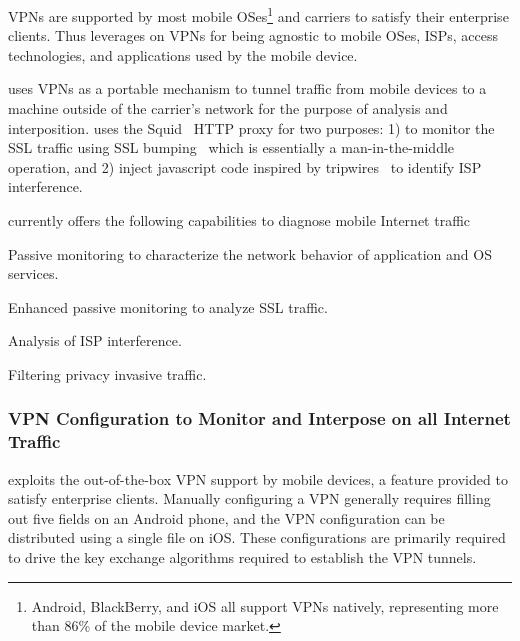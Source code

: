 VPNs are supported by most mobile OSes\footnote{Android, BlackBerry, and iOS all support VPNs natively, representing more than 86\% of the mobile device market\cite{gartner-phone-share}.} and carriers to satisfy their enterprise clients. 
Thus \meddle leverages on VPNs for being agnostic to mobile OSes, ISPs, access technologies, and applications used by the mobile device.


\meddle uses VPNs as a portable mechanism to tunnel traffic from mobile devices to a machine outside of the carrier's network for the purpose of analysis and interposition.
\meddle uses the Squid~\cite{squid} HTTP proxy for two purposes: 1) to monitor the SSL traffic using SSL bumping~\cite{sslbump} which is essentially a man-in-the-middle operation, and 2) inject javascript code inspired by tripwires~\cite{tripwires} to identify ISP interference.

\meddle currently offers the following capabilities to diagnose mobile Internet traffic
\begin{packedenumerate}
\item Passive monitoring to characterize the network behavior of application and OS services. 
\item Enhanced passive monitoring to analyze SSL traffic.
\item Analysis of ISP interference.
\item Filtering privacy invasive traffic. 
\end{packedenumerate}

\subsubsection{VPN Configuration to Monitor and Interpose on all Internet Traffic}
\label{sec:VPN Configuration}

\meddle exploits the out-of-the-box VPN support by mobile devices, a feature provided to satisfy enterprise clients. 
Manually configuring a VPN generally requires filling out five fields on an Android phone, and the VPN configuration can be distributed using a single file on iOS. 
These configurations are primarily required to drive the key exchange algorithms required to establish the VPN tunnels. 

